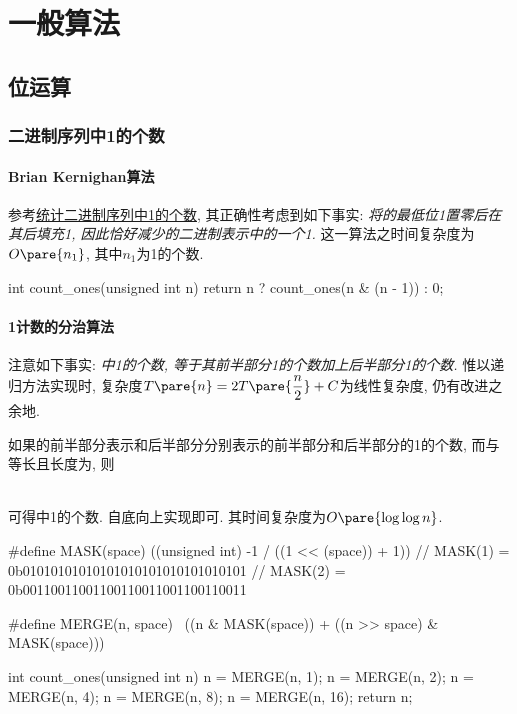 \documentclass{ctexart}
\begin{document}

\section{一般算法} %
\label{sec:一般算法}

\subsection{位运算} %
\label{sub:位运算}

\subsubsection{二进制序列中1的个数} %
\label{ssub:二进制序列中1的个数}

\paragraph{Brian Kernighan算法} %
\label{par:brian_kernighan算法}

参考\href{https://www.geeksforgeeks.org/count-set-bits-in-an-integer/}{统计二进制序列中1的个数}, 其正确性考虑到如下事实: \emph{将的最低位1置零后在其后填充1, 因此恰好减少的二进制表示中的一个1.} 这一算法之时间复杂度为$O\pare{n_1}$, 其中$n_1$为1的个数.
\begin{cpplst}
int count_ones(unsigned int n)
{
    return n ? count_ones(n & (n - 1)) : 0;
}
\end{cpplst}


\paragraph{1计数的分治算法} %
\label{par:1计数的分治算法}

注意如下事实: \emph{中1的个数, 等于其前半部分1的个数加上后半部分1的个数.} 惟以递归方法实现时, 复杂度$\displaystyle T\pare{n} = 2T\pare{\frac{n}{2}} + C$为线性复杂度, 仍有改进之余地.
\par
如果的前半部分表示和后半部分分别表示的前半部分和后半部分的1的个数, 而与等长且长度为, 则\\\centerline{}\\可得中1的个数. 自底向上实现即可. 其时间复杂度为$O\pare{\log\log n}$.
\begin{cpplst}
#define MASK(space) ((unsigned int) -1 / ((1 << (space)) + 1))
// MASK(1) = 0b01010101010101010101010101010101
// MASK(2) = 0b00110011001100110011001100110011

#define MERGE(n, space) \
    ((n & MASK(space)) + ((n >> space) & MASK(space)))

int count_ones(unsigned int n)
{
    n = MERGE(n, 1);
    n = MERGE(n, 2);
    n = MERGE(n, 4);
    n = MERGE(n, 8);
    n = MERGE(n, 16);
    return n;
}
\end{cpplst}
\end{document}
